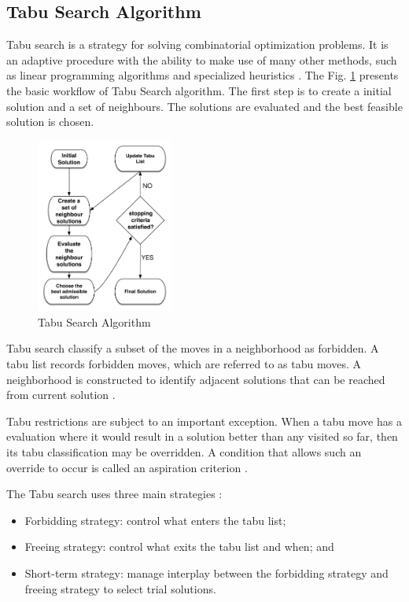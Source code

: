 \subsection{Tabu Search Algorithm}

Tabu search is a strategy for solving combinatorial
optimization problems. It is an adaptive procedure with the ability to make use of many other methods, such as linear programming algorithms and specialized heuristics \cite{Glover1989}. The Fig. \ref{fig:tabualg} presents the basic workflow of Tabu Search algorithm. The first step is to create a initial solution and a set of neighbours. The solutions are evaluated and the best feasible solution is chosen.

\begin{figure}
\centering
\includegraphics[width=0.4\textwidth]{./images/tabualgorithm.png}
\caption{Tabu Search Algorithm}
\label{fig:tabualg}
\end{figure}


Tabu search  classify a subset of the moves in a neighborhood as forbidden. A tabu list records forbidden moves, which are referred to as tabu moves. A neighborhood is constructed to identify adjacent solutions that can be reached from current solution \cite{reeves1993modern}. 

Tabu restrictions are subject to an important exception.  When a tabu move has a evaluation where it would result in a solution better than any visited so far, then its tabu classification may be overridden.  A condition that allows such an override to occur is called an aspiration criterion \cite{reeves1993modern}. 

The Tabu search uses three main strategies \cite{reeves1993modern}:

\begin{itemize}
\item Forbidding strategy: control what enters the tabu list;
\item Freeing strategy: control what exits the tabu list and when; and
\item Short-term strategy: manage interplay between the forbidding strategy and freeing strategy to select trial solutions.
\end{itemize}